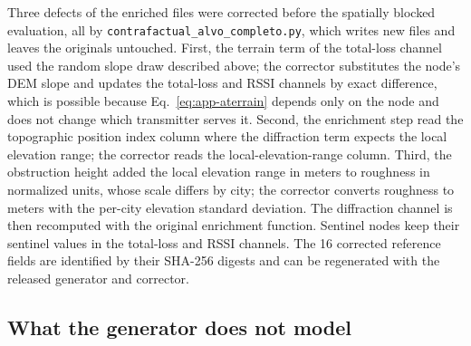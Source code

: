 Three defects of the enriched files were corrected before the spatially
blocked evaluation, all by \texttt{contrafactual\_\allowbreak{}alvo\_\allowbreak{}completo\allowbreak{}.py}, which
writes new files and leaves the originals untouched. First, the terrain term
of the total-loss channel used the random slope draw described above; the
corrector substitutes the node's DEM slope and updates the total-loss and
RSSI channels by exact difference, which is possible because
Eq.~\eqref{eq:app-aterrain} depends only on the node and does not change which
transmitter serves it. Second, the enrichment step read the topographic
position index column where the diffraction term expects the local
elevation range; the corrector reads the local-elevation-range column. Third, the
obstruction height added the local elevation range in meters to roughness in normalized
units, whose scale differs by city; the corrector converts roughness to
meters with the per-city elevation standard deviation. The diffraction
channel is then recomputed with the original enrichment function. Sentinel
nodes keep their sentinel values in the total-loss and RSSI channels. The
16 corrected reference fields are identified by their SHA-256 digests and
can be regenerated with the released generator and corrector.

\subsection{What the generator does not model}

